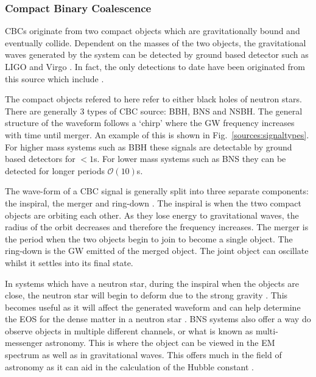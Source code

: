 \subsubsection{\label{sources:transient:cbc} Compact Binary Coalescence}

\acp{CBC} originate from two compact objects which are gravitationally bound and eventually collide.
Dependent on the masses of the two objects, the gravitational waves generated by the system can be detected by ground based detector such as LIGO \citep{aasi2015AdvancedLIGO} and Virgo \citep{acernese2015AdvancedVirgo}. 
In fact, the only detections to date have been originated from this source which include \citep{abbott2016ObservationGravitational,abbott2017GW170814ThreeDetector,abbott2017GW170817Observation}.

The compact objects refered to here refer to either black holes of neutron stars.
There are generally 3 types of \ac{CBC} source: \ac{BBH}, \ac{BNS} and \ac{NSBH}.
The general structure of the waveform follows a `chirp' where the \ac{GW} frequency increases with time until merger. An example of this is shown in Fig.~\ref{sources:signaltypes}.
For higher mass systems such as \ac{BBH} these signals are detectable by ground based detectors for $< 1$s. 
For lower mass systems such as \ac{BNS} they can be detected for longer periods $\mathcal{O}(10)$s. 

The wave-form of a \ac{CBC} signal is generally split into three separate components: the inspiral, the merger and ring-down \citep{}. 
The inspiral is when the ttwo compact objects are orbiting each other. As they lose energy to gravitational waves, the radius of the orbit decreases and therefore the frequency increases.
The merger is the period when the two objects begin to join to become a single object.
The ring-down is the \ac{GW} emitted of the merged object. The joint object can oscillate whilst it settles into its final state. 

In systems which have a neutron star, during the inspiral when the objects are close, the neutron star will begin to deform due to the strong gravity \citep{}. 
This becomes useful as it will affect the generated waveform and can help determine the \ac{EOS} for the dense matter in a neutron star \citep{}.
\ac{BNS} systems also offer a way do observe objects in multiple different channels, or what is known as multi-messenger astronomy. 
This is where the object can be viewed in the \ac{EM} spectrum as well as in gravitational waves.
This offers much in the field of astronomy as it can aid in the calculation of the Hubble constant \citep{}. 

